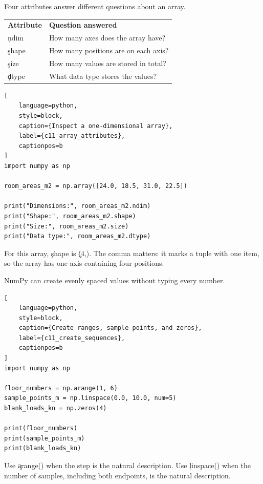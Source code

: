 
Four attributes answer different questions about an array.

\begin{center}
\begin{tabular}{ll}
\textbf{Attribute} & \textbf{Question answered} \\
\c{ndim} & How many axes does the array have? \\
\c{shape} & How many positions are on each axis? \\
\c{size} & How many values are stored in total? \\
\c{dtype} & What data type stores the values? \\
\end{tabular}
\end{center}

\begin{lstlisting}[
    language=python,
    style=block,
    caption={Inspect a one-dimensional array},
    label={c11_array_attributes},
    captionpos=b
]
import numpy as np

room_areas_m2 = np.array([24.0, 18.5, 31.0, 22.5])

print("Dimensions:", room_areas_m2.ndim)
print("Shape:", room_areas_m2.shape)
print("Size:", room_areas_m2.size)
print("Data type:", room_areas_m2.dtype)
\end{lstlisting}

For this array, \c{shape} is \c{(4,)}. The comma matters: it marks a tuple with
one item, so the array has one axis containing four positions.


NumPy can create evenly spaced values without typing every number.

\begin{lstlisting}[
    language=python,
    style=block,
    caption={Create ranges, sample points, and zeros},
    label={c11_create_sequences},
    captionpos=b
]
import numpy as np

floor_numbers = np.arange(1, 6)
sample_points_m = np.linspace(0.0, 10.0, num=5)
blank_loads_kn = np.zeros(4)

print(floor_numbers)
print(sample_points_m)
print(blank_loads_kn)
\end{lstlisting}

Use \c{arange()} when the step is the natural description. Use
\c{linspace()} when the number of samples, including both endpoints, is the
natural description.

